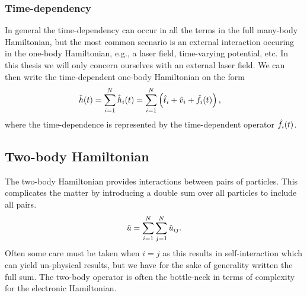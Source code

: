             \subsubsection{Time-dependency}
                In general the time-dependency can occur in all the terms in the
                full many-body Hamiltonian, but the most common scenario is an
                external interaction occuring in the one-body Hamiltonian, e.g.,
                a laser field, time-varying potential, etc.
                In this thesis we will only concern ourselves with an external
                laser field.
                We can then write the time-dependent one-body Hamiltonian on the
                form
                \begin{align}
                    \hat{h}(t)
                    &= \sum_{i = 1}^{N} \hat{h}_i(t)
                    = \sum_{i = 1}^{N}\left( 
                        \hat{t}_i
                        + \hat{v}_i
                        + \hat{f}_i(t)
                     \right),
                \end{align}
                where the time-dependence is represented by the time-dependent
                operator $\hat{f}_i(t)$.


        \subsection{Two-body Hamiltonian}
            The two-body Hamiltonian provides interactions between pairs of
            particles.
            This complicates the matter by introducing a double sum over all
            particles to include all pairs.
            \begin{align}
                \hat{u}
                = \sum_{i = 1}^{N} \sum_{j = 1}^{N} \hat{u}_{ij}.
            \end{align}
            Often some care must be taken when $i = j$ as this results in
            self-interaction which can yield un-physical results, but we have
            for the sake of generality written the full sum.
            The two-body operator is often the bottle-neck in terms of
            complexity for the electronic Hamiltonian.

